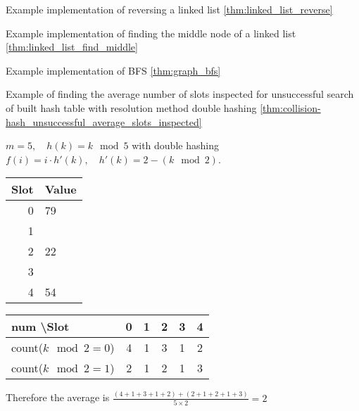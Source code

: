 \begin{example}
    \label{eg:linked_list_reverse}
    Example implementation of reversing a linked list \ref{thm:linked_list_reverse}
\end{example}


\begin{example}
    \label{eg:linked_list_find_middle}
    Example implementation of finding the middle node of a linked list \ref{thm:linked_list_find_middle}
\end{example}


\begin{example}
    \label{eg:graph_bfs}
    Example implementation of BFS \ref{thm:graph_bfs}
\end{example}


\begin{example}
    \label{eg:hash_unsuccessful_double_hashing}
    Example of finding the average number of slots inspected for unsuccessful search of built hash table with resolution method double hashing \ref{thm:collision-hash_unsuccessful_average_slots_inspected}

    $m = 5,\quad h(k) = k \mod 5$ with double hashing $f(i) = i \cdot h'(k),\quad h'(k) = 2 - (k \mod 2)$.
    \begin{center}
        \begin{tabular}{|r|l|}
            \hline
            \textbf{Slot} & \textbf{Value} \\
            \hline
            0             & 79             \\
            1             &                \\
            2             & 22             \\
            3             &                \\
            4             & 54             \\
            \hline
        \end{tabular}
        \begin{tabular}{|l|ccccc|}
            \hline
            \textbf{num \textbackslash Slot} & 0 & 1 & 2 & 3 & 4 \\
            \hline
            count($k \mod 2=0$)              & 4 & 1 & 3 & 1 & 2 \\
            count($k \mod 2=1$)              & 2 & 1 & 2 & 1 & 3 \\
            \hline
        \end{tabular}
    \end{center}
    Therefore the average is $\frac{(4+1+3+1+2)+(2+1+2+1+3)}{5\times 2} = 2$
\end{example}

